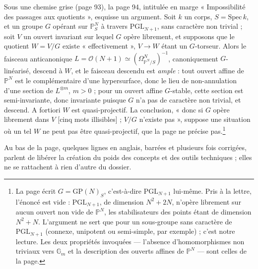\documentclass[11pt,a4paper]{article}
\begin{document}
Sous une chemise grise (page 93), la page 94, intitulée en marge
« Impossibilité des passages aux quotients », esquisse un argument. Soit $k$ un
corps, $S = \mathrm{Spec}\,k$, et un groupe $G$ opérant sur $\mathbb{P}^{N}_S$
à travers $\mathrm{PGL}_{N+1}$, sans caractère non trivial ; soit $V$ un
ouvert invariant sur lequel $G$ opère librement, et supposons que le quotient
$W = V/G$ existe « effectivement », $V \to W$ étant un $G$-torseur. Alors le
faisceau anticanonique $L = \mathcal{O}(N+1) \simeq
(\Omega^{N}_{\mathbb{P}^N/S})^{-1}$, canoniquement $G$-linéarisé, descend à $W$,
et le faisceau descendu est \emph{ample} : tout ouvert affine de $\mathbb{P}^N$
est le complémentaire d'une hypersurface, donc le lieu de non-annulation d'une
section de $L^{\otimes m}$, $m > 0$ ; pour un ouvert affine $G$-stable, cette
section est semi-invariante, donc invariante puisque $G$ n'a pas de caractère
non trivial, et descend. A fortiori $W$ est quasi-projectif. La conclusion,
« donc si $G$ opère librement dans $V$ [cinq mots illisibles] ; $V/G$ n'existe
pas », suppose une situation où un tel $W$ ne peut pas être quasi-projectif,
que la page ne précise pas.\footnote{La page écrit $G = \mathrm{GP}(N)_S$,
c'est-à-dire $\mathrm{PGL}_{N+1}$ lui-même. Pris à la lettre, l'énoncé est
vide : $\mathrm{PGL}_{N+1}$, de dimension $N^{2} + 2N$, n'opère librement sur
aucun ouvert non vide de $\mathbb{P}^{N}$, les stabilisateurs des points étant
de dimension $N^{2} + N$. L'argument ne sert que pour un sous-groupe sans
caractère de $\mathrm{PGL}_{N+1}$ (connexe, unipotent ou semi-simple, par
exemple) ; c'est notre lecture. Les deux propriétés invoquées — l'absence
d'homomorphismes non triviaux vers $\mathbb{G}_m$ et la description des ouverts
affines de $\mathbb{P}^{N}$ — sont celles de la page.}

Au bas de la page, quelques lignes en anglais, barrées et plusieurs fois
corrigées, parlent de libérer la création du poids des concepts et des outils
techniques ; elles ne se rattachent à rien d'autre du dossier.
\end{document}
